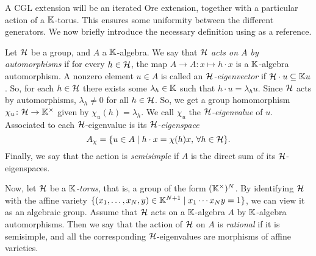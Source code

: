 A CGL extension will be an iterated Ore extension, together with a particular action of
a $\mathbb{K}$-torus. This ensures some uniformity between the different generators. We now
briefly introduce the necessary definition using \cite{GoodearlBrown2002LecturesAQC} as
a reference.

Let $\mathcal{H}$ be a group, and $A$ a $\mathbb{K}$-algebra. We say that $\mathcal{H}$ \emph{acts on $A$
	by automorphisms} if for every $h \in \mathcal{H}$, the map $A
	\to A \colon x \mapsto h \cdot x$ is a $\mathbb{K}$-algebra automorphism. A nonzero element
$u \in A$ is called an \emph{$\mathcal{H}$-eigenvector} if $\mathcal{H}
	\cdot u \subseteq \mathbb{K} u$. So, for each $h \in \mathcal{H}$ there exists some $\lambda_h \in
	\mathbb{K}$ such that $h \cdot u = \lambda_h u$. Since $\mathcal{H}$ acts by automorphisms,
$\lambda_h \neq 0$ for all $h \in \mathcal{H}$. So, we get a group homomorphism $\chi_u \colon
	\mathcal{H} \to \mathbb{K}^\times$ given by $\chi_u(h) = \lambda_h$. We call $\chi_u$ the
\emph{$\mathcal{H}$-eigenvalue} of $u$. Associated to each
$\mathcal{H}$-eigenvalue is its \emph{$\mathcal{H}$-eigenspace}
\begin{equation*}
	A_\chi = \{u \in A \mid h \cdot x = \chi(h)x,\, \forall h \in \mathcal{H} \}.
\end{equation*}
%
Finally, we say that the action is \emph{semisimple} if $A$ is
the direct sum of its $\mathcal{H}$-eigenspaces.

Now, let $\mathcal{H}$ be a \emph{$\mathbb{K}$-torus}, that is, a group of the form
$(\mathbb{K}^\times)^N$. By identifying $\mathcal{H}$ with the affine variety $\{(x_1, \dots, x_N,
	y) \in \mathbb{K}^{N+1} \mid x_1 \cdots x_N y = 1\}$, we can view it as an algebraic group.
Assume that $\mathcal{H}$ acts on a $\mathbb{K}$-algebra $A$ by $\mathbb{K}$-algebra automorphisms. Then
we say that the action of $\mathcal{H}$ on $A$ is \emph{rational} if it
is semisimple, and all the corresponding $\mathcal{H}$-eigenvalues are morphisms of affine
varieties.

